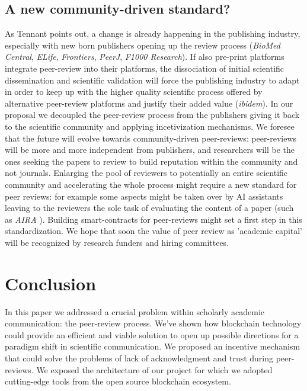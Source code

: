 \documentclass[runningheads]{llncs}
\begin{document}
\subsection{A new community-driven standard?}
As Tennant points out\cite{Tennant2017-F1000R}, a change is already happening in the publishing industry, especially with new born publishers opening up the review process (\emph{BioMed Central}, \emph{ELife}, \emph{Frontiers}, \emph{PeerJ}, \emph{F1000 Research}). If also pre-print platforms integrate peer-review into their platforms, the dissociation of initial scientific dissemination and scientific validation will force the publishing industry to adapt in order to keep up with the higher quality scientific process offered by alternative peer-review platforms and justify their added value (\emph{ibidem}).
In our proposal we decoupled the peer-review process from the publishers giving it back to the scientific community and applying incetivization mechanisms. We foresee that the future will evolve towards community-driven peer-reviews: peer-reviews will be more and more independent from publishers, and researchers will be the ones seeking the papers to review to build reputation within the community and not journals.
\newline Enlarging the pool of reviewers to potentially an entire scientific community and accelerating the whole process might require a new standard for peer reviews: for example some aspects might be taken over by AI assistants leaving to the reviewers the sole task of evaluating the content of a paper (such as \emph{AIRA} \cite{}). Building smart-contracts for peer-reviews might set a first step in this standardization. We hope that soon the value of peer review as 'academic capital' will be recognized by research funders and hiring committees.

\section{Conclusion}
In this paper we addressed a crucial problem within scholarly academic communication: the peer-review process. We've shown how blockchain technology could provide an efficient and viable solution to open up possible directions for a paradigm shift in scientific communication. We proposed an incentive mechanism that could solve the problems of lack of acknowledgment and trust during peer-reviews. We exposed the architecture of our project for which we adopted cutting-edge tools from the open source blockchain ecosystem.
\end{document}
